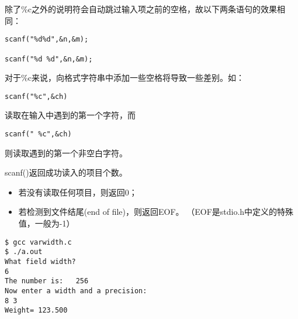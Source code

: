 \begin{frame}[fragile]

除了{\tf \%c}之外的说明符会自动跳过输入项之前的空格，故以下两条语句的效果相同：
\begin{lstlisting}[showspaces=true,backgroundcolor=\color{red!10}]
scanf("%d%d",&n,&m);

scanf("%d %d",&n,&m);
\end{lstlisting}
\end{frame}

\begin{frame}[fragile]
对于{\tf \%c}来说，向格式字符串中添加一些空格将导致一些差别。如：
\begin{lstlisting}[showspaces=true,backgroundcolor=\color{red!10}]
scanf("%c",&ch)
\end{lstlisting}
读取在输入中遇到的第一个字符，而
\begin{lstlisting}[showspaces=true,backgroundcolor=\color{red!10}]
scanf(" %c",&ch)
\end{lstlisting}
则读取遇到的第一个非空白字符。
\end{frame}

\begin{frame}[fragile]
{\tf scanf()}返回成功读入的项目个数。

\begin{itemize}
\item
\tf 若没有读取任何项目，则返回0；
\item
若检测到文件结尾(end of file)，则返回EOF。
（EOF是stdio.h中定义的特殊值，一般为-1）
\end{itemize}

\end{frame}

\begin{frame}

\end{frame}

\begin{frame}[fragile]
\begin{lstlisting}[showspaces=true,backgroundcolor=\color{red!10}]
$ gcc varwidth.c
$ ./a.out
What field width?
6
The number is:   256
Now enter a width and a precision:
8 3
Weight= 123.500
\end{lstlisting}
\end{frame}

